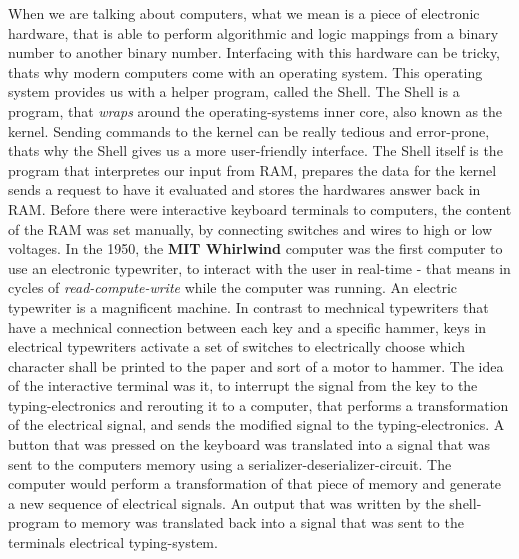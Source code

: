 \begin{challenge}
 
    \begin{chadescription}
        When we are talking about computers, what we mean is a piece of electronic hardware, that is able to perform algorithmic and logic mappings from a binary number to another binary number.
        Interfacing with this hardware can be tricky, thats why modern computers come with an operating system.
        This operating system provides us with a helper program, called the Shell.
        The Shell is a program, that \textit{wraps} around the operating-systems inner core, also known as the kernel.
        Sending commands to the kernel can be really tedious and error-prone, thats why the Shell gives us a more user-friendly interface.
        The Shell itself is the program that interpretes our input from RAM, prepares the data for the kernel sends a request to have it evaluated and stores the hardwares answer back in RAM.
        Before there were interactive keyboard terminals to computers, the content of the RAM was set manually, by connecting switches and wires to high or low voltages.
        In the 1950, the \textbf{MIT Whirlwind} computer was the first computer to use an electronic typewriter, to interact with the user in real-time - that means in cycles of \textit{read-compute-write} while the computer was running.
        An electric typewriter is a magnificent machine. 
        In contrast to mechnical typewriters that have a mechnical connection between each key and a specific hammer, keys in electrical typewriters activate a set of switches to electrically choose which character shall be printed to the paper and sort of a motor to hammer.
        The idea of the interactive terminal was it, to interrupt the signal from the key to the typing-electronics and rerouting it to a computer, that performs a transformation of the electrical signal, and sends the modified signal to the typing-electronics. 
        A button that was pressed on the keyboard was translated into a signal that was sent to the computers memory using a serializer-deserializer-circuit.
        The computer would perform a transformation of that piece of memory and generate a new sequence of electrical signals.
        An output that was written by the shell-program to memory was translated back into a signal that was sent to the terminals electrical typing-system.

\end{chadescription}
\end{challenge}
